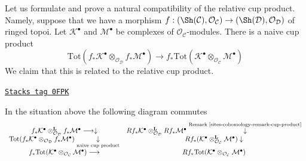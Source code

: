 \medskip\noindent
Let us formulate and prove a natural compatibility of the
relative cup product. Namely, suppose that we have a morphism
$f : (\Sh(\mathcal{C}), \mathcal{O}_\mathcal{C}) \to
(\Sh(\mathcal{D}), \mathcal{O}_\mathcal{D})$ of ringed topoi.
Let $\mathcal{K}^\bullet$ and $\mathcal{M}^\bullet$
be complexes of $\mathcal{O}_\mathcal{C}$-modules.
There is a naive cup product
$$
\text{Tot}(
f_*\mathcal{K}^\bullet
\otimes_{\mathcal{O}_\mathcal{D}}
f_*\mathcal{M}^\bullet)
\longrightarrow
f_*\text{Tot}(\mathcal{K}^\bullet
\otimes_{\mathcal{O}_\mathcal{C}}
\mathcal{M}^\bullet)
$$
We claim that this is related to the relative cup product.

\begin{lemma}
\label{sites-cohomology-lemma-cup-compatible-with-naive}
\href{https://stacks.math.columbia.edu/tag/0FPK}{\texttt{Stacks tag 0FPK}}

In the situation above the following diagram commutes
$$
\begin{array}{cc}f_*\mathcal{K}^\bullet
\otimes_{\mathcal{O}_\mathcal{D}}^\mathbf{L}
f_*\mathcal{M}^\bullet \longrightarrow\downarrow & Rf_*\mathcal{K}^\bullet
\otimes_{\mathcal{O}_\mathcal{D}}^\mathbf{L}
Rf_*\mathcal{M}^\bullet \overset{\text{Remark \ref{sites-cohomology-remark-cup-product}}}{\downarrow} \\ \text{Tot}(
f_*\mathcal{K}^\bullet
\otimes_{\mathcal{O}_\mathcal{D}}
f_*\mathcal{M}^\bullet) \underset{\text{naive cup product}}{\downarrow} & Rf_*(\mathcal{K}^\bullet
\otimes_{\mathcal{O}_\mathcal{C}}^\mathbf{L}
\mathcal{M}^\bullet) \downarrow \\ f_*\text{Tot}(\mathcal{K}^\bullet
\otimes_{\mathcal{O}_\mathcal{C}}
\mathcal{M}^\bullet) \longrightarrow & Rf_*\text{Tot}(\mathcal{K}^\bullet
\otimes_{\mathcal{O}_\mathcal{C}}
\mathcal{M}^\bullet)\end{array}
$$
\end{lemma}

